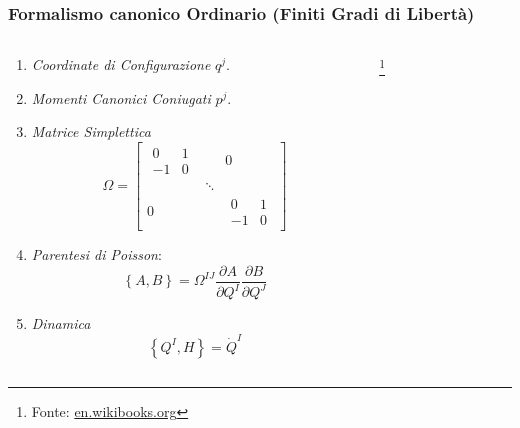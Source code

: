 \documentclass[8pt,handout]{beamer}
\begin{document}
	\begin{frame}	%
		\frametitle{Formalismo canonico Ordinario (Finiti Gradi di Libertà)}
  			\begin{columns}[T]
    			\begin{column}{.5\textwidth}
						\begin{enumerate}
							\item\emph{Coordinate di Configurazione} $q^j$.
							\item\emph{Momenti Canonici Coniugati}  $p^j$.
							\item \emph{Matrice Simplettica} 
								\begin{displaymath}
									\Omega=\begin{bmatrix}
										\begin{matrix}0 & 1\\ -1 & 0\end{matrix} & & 0 \\
											 & \ddots & \\
											 0 & & \begin{matrix}0 & 1 \\ -1 & 0
										\end{matrix}
									\end{bmatrix}
								\end{displaymath}
							\item \emph{Parentesi di Poisson}: 
								\begin{displaymath}
									\left\{A , B \right\} = \Omega^{I J} \frac{\partial A}{\partial Q^I} \frac{\partial B}{\partial Q^J}					
								\end{displaymath}
							\item \emph{Dinamica}
								\begin{displaymath}
									\left\{Q^I, H \right\} = \dot{Q}^I
								\end{displaymath}
							
								
								
						\end{enumerate}
    			\end{column}
    		   	\begin{column}{.5\textwidth}
					\parbox[c][.7\textheight][c]{\columnwidth}{%
 						\center \footnote{Fonte: 
 							\href{https://en.wikibooks.org/wiki/A-level_Physics_(Advancing_Physics)/Simple_Harmonic_Motion}{en.wikibooks.org}}
  					}	
    			\end{column}
  			\end{columns}	
		\end{frame}
\end{document}
